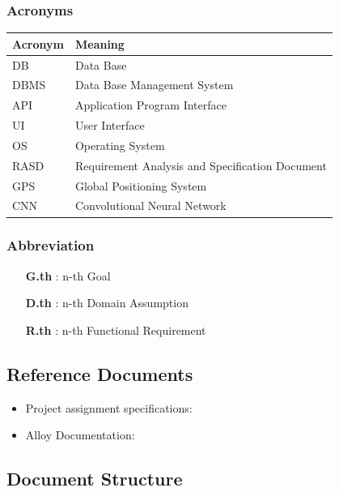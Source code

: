 \subsubsection{Acronyms}
\begin{tabular}{|l|l|}
\hline
Acronym & Meaning \\ \hline
DB & Data Base \\ \hline
DBMS & Data Base Management System \\ \hline
API & Application Program Interface \\ \hline
UI & User Interface \\ \hline
OS & Operating System \\ \hline
RASD & Requirement Analysis and Specification Document \\ \hline
GPS & Global Positioning System \\ \hline
CNN & Convolutional Neural Network \\
\hline
\end{tabular}

\subsubsection{Abbreviation}

\begin{itemize}

\item [\textbf{G.th}]: n-th Goal

\item [\textbf{D.th}]: n-th Domain Assumption

\item [\textbf{R.th}]: n-th Functional Requirement

\end{itemize}

\subsection{Reference Documents}

\begin{itemize}

\item Project assignment specifications:\cite{assignment.pdf}

\item Alloy Documentation:\cite{http://alloy.lcs.mit.edu/alloy/documentation.html}

\end{itemize}

\subsection{Document Structure}


